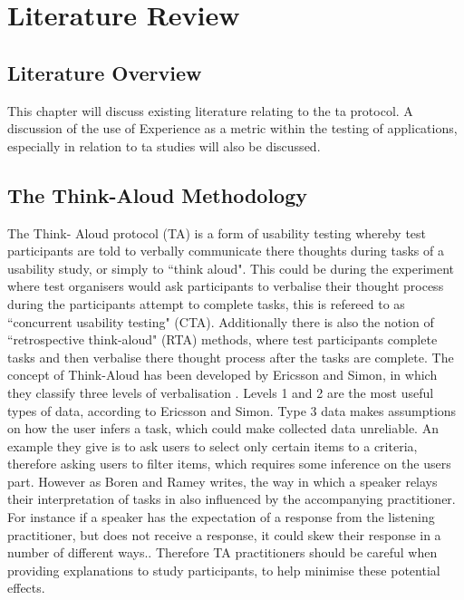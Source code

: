\chapter{Literature Review}

\section{Literature Overview}
This chapter will discuss existing literature relating to the \gls{ta} protocol. A discussion of the use of Experience as a metric within the testing of applications, especially in relation to \gls{ta} studies will also be discussed.
\section{The Think-Aloud Methodology}
The Think- Aloud protocol (TA) is a form of usability testing whereby test participants are told to verbally communicate there thoughts during tasks of a usability study, or simply to ``think aloud". This could be during the experiment where test organisers would ask participants to verbalise their thought process during the participants attempt to complete tasks, this is refereed to as ``concurrent usability testing" (CTA). Additionally there is also the notion of ``retrospective think-aloud" (RTA) methods, where test participants complete tasks and then verbalise there thought process after the tasks are complete. The concept of Think-Aloud has been developed by Ericsson and Simon, in which they classify three levels of verbalisation \citep{ericsson1998study}. Levels 1 and 2 are the most useful types of data, according to Ericsson and Simon. Type 3 data makes assumptions on how the user infers a task, which could make collected data unreliable. An example they give is to ask users to select only certain items to a criteria, therefore asking users to filter items, which requires some inference on the users part. However as Boren and Ramey writes, the way in which a speaker relays their interpretation of tasks in also influenced by the accompanying practitioner. For instance if a speaker has the expectation of a response from the listening practitioner, but does not receive a response, it could skew their response in a number of different ways.\citep{boren2000thinking}. Therefore TA practitioners should be careful when providing explanations to study participants, to help minimise these potential effects.

